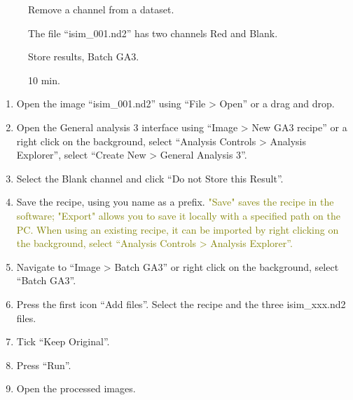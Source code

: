 \pagebreak
{}

\begin{description}
    \item[] Remove a channel from a dataset.
    \item[] The file ``isim\_001.nd2'' has two channels Red and Blank.
    \item[] Store results, Batch GA3.
    \item[] 10 min.
    \item[]
\end{description}

\begin{enumerate}
    \item Open the image “isim\_001.nd2” using “File > Open” or a drag and drop.
    \item Open the General analysis 3 interface using “Image > New GA3 recipe” or a right click on the background, select “Analysis Controls > Analysis Explorer”, select “Create New > General Analysis 3”. 
    \item Select the Blank channel and click “Do not Store this Result”.
    \item Save the recipe, using you name as a prefix. \textcolor{olive}{"Save" saves the recipe in the software; "Export" allows you to save it locally with a specified path on the PC. When using an existing recipe, it can be imported by right clicking on the background, select “Analysis Controls > Analysis Explorer”.}
    \item Navigate to “Image > Batch GA3” or right click on the background, select “Batch GA3”.
    \item Press the first icon “Add files”. Select the recipe and the three isim\_xxx.nd2 files.
    \item Tick “Keep Original”.
    \item Press “Run”.
    \item Open the processed images.
\end{enumerate}